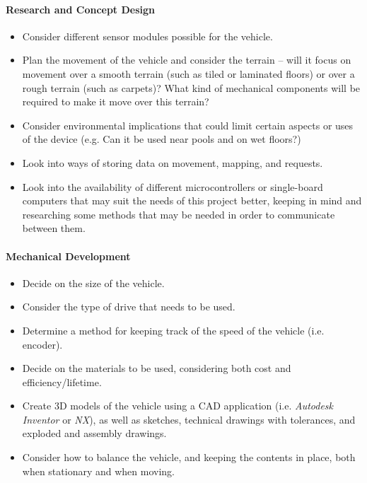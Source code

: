 \documentclass[11pt]{article}
\begin{document}
\paragraph{Research and Concept Design}
\begin{itemize}
\item{Consider different sensor modules possible for the vehicle.}
\item{Plan the movement of the vehicle and consider the terrain – will it focus on movement over a smooth terrain (such as tiled or laminated floors) or over a rough terrain (such as carpets)? What kind of mechanical components will be required to make it move over this terrain?}
\item{Consider environmental implications that could limit certain aspects or uses of the device (e.g. Can it be used near pools and on wet floors?)}
\item{Look into ways of storing data on movement, mapping, and requests.}
\item{Look into the availability of different microcontrollers or single-board computers that may suit the needs of this project better, keeping in mind and researching some methods that may be needed in order to communicate between them.}
\end{itemize}
\paragraph{Mechanical Development}
\begin{itemize}
\item{Decide on the size of the vehicle.}
\item{Consider the type of drive that needs to be used.}
\item{Determine a method for keeping track of the speed of the vehicle (i.e. encoder).}
\item{Decide on the materials to be used, considering both cost and efficiency/lifetime.}
\item{Create 3D models of the vehicle using a CAD application (i.e. \textit{Autodesk Inventor} or \textit{NX}), as well as sketches, technical drawings with tolerances, and exploded and assembly drawings.}
\item{Consider how to balance the vehicle, and keeping the contents in place, both when stationary and when moving.}
\end{itemize}
\end{document}

